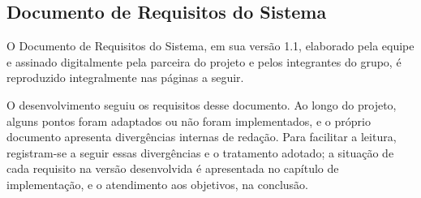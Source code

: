 
\begin{apendicesenv}

\partapendices

\chapter{Documento de Requisitos do Sistema}\label{apendice-requisitos}

O Documento de Requisitos do Sistema, em sua versão 1.1, elaborado pela equipe e assinado digitalmente pela parceira do projeto e pelos integrantes do grupo, é reproduzido integralmente nas páginas a seguir.

O desenvolvimento seguiu os requisitos desse documento. Ao longo do projeto, alguns pontos foram adaptados ou não foram implementados, e o próprio documento apresenta divergências internas de redação. Para facilitar a leitura, registram-se a seguir essas divergências e o tratamento adotado; a situação de cada requisito na versão desenvolvida é apresentada no capítulo de implementação, e o atendimento aos objetivos, na conclusão.


\end{apendicesenv}
